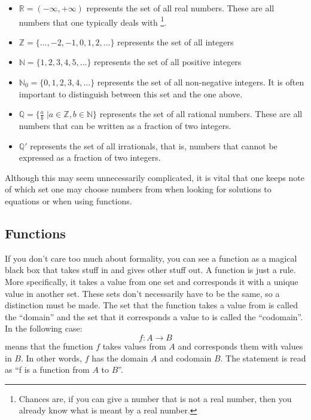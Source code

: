 \documentclass[a4paper,12pt]{article}
\begin{document}
\begin{itemize}
\item $\mathbb{R} = \left(-\infty, +\infty\right)$ represents the set of all real numbers. These are all numbers that one typically deals with \footnote{Chances are, if you can give a number that is not a real number, then you already know what is meant by a real number.}. 
\item $\mathbb{Z} = \{..., -2, -1, 0, 1, 2, ... \}$ represents the set of all integers
\item $\mathbb{N} = \{1, 2, 3, 4, 5, ... \}$ represents the set of all positive integers
\item $\mathbb{N}_0 = \{0, 1, 2, 3, 4, ... \}$ represents the set of all non-negative integers. It is often important to distinguish between this set and the one above.
\item $\mathbb{Q} = \{ \frac{a}{b}\; | a\in \mathbb{Z}, b \in \mathbb{N} \}$ represents the set of all rational numbers. These are all numbers that can be written as a fraction of two integers.
\item $\mathbb{Q}'$ represents the set of all irrationals, that is, numbers that cannot be expressed as a fraction of two integers.
\end{itemize}

Although this may seem unnecessarily complicated, it is vital that one keeps note of which set one may choose numbers from when looking for solutions to equations or when using functions.

\subsection{Functions}
If you don't care too much about formality, you can see a function as a magical black box that takes stuff in and gives other stuff out. A function is just a rule. More specifically, it takes a value from one set and corresponds it with a unique value in another set. These sets don't necessarily have to be the same, so a distinction must be made. The set that the function takes a value from is called the ``domain'' and the set that it corresponds a value to is called the ``codomain''. In the following case:
$$f:A \rightarrow B$$
means that the function $f$ takes values from $A$ and corresponds them with values in $B$. In other words, $f$ has the domain $A$ and codomain $B$. The statement is read as ``f is a function from $A$ to $B$''.
\end{document}

